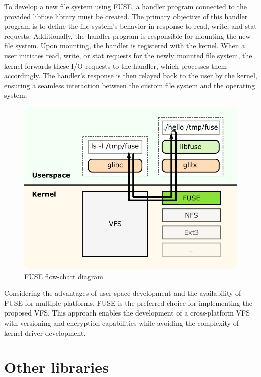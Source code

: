 To develop a new file system using FUSE, a handler program connected to the provided libfuse library must be created.
The primary objective of this handler program is to define the file system's behavior in response to read, write, and stat requests.
Additionally, the handler program is responsible for mounting the new file system.
Upon mounting, the handler is registered with the kernel.
When a user initiates read, write, or stat requests for the newly mounted file system, the kernel forwards these I/O requests to the handler, which processes them accordingly.
The handler's response is then relayed back to the user by the kernel, ensuring a seamless interaction between the custom file system and the operating system.

\begin{figure}[ht]
    \centering
    \includegraphics[width=\linewidth]{img/fuse_diagram}
    \caption{FUSE flow-chart diagram}
\end{figure}

Considering the advantages of user space development and the availability of FUSE for multiple platforms, FUSE is the preferred choice for implementing the proposed VFS.
This approach enables the development of a cross-platform VFS with versioning and encryption capabilities while avoiding the complexity of kernel driver development.

\section{Other libraries}\label{sec:other-libraries-analysis}

